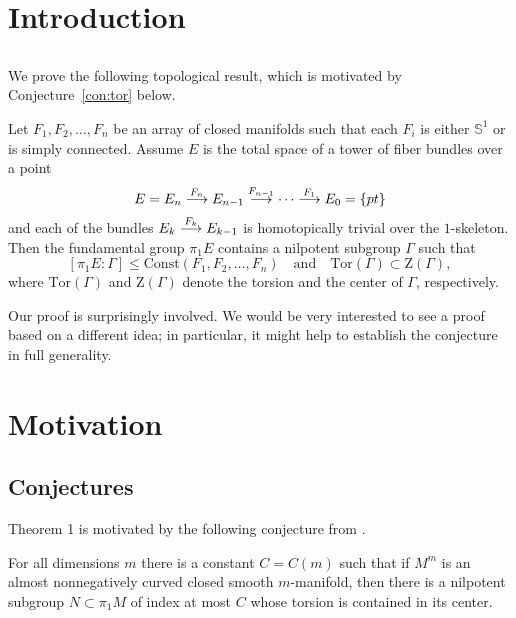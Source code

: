 \documentclass{amsart}
\begin{document}
\section*{Introduction}

\subsection{}
We prove the following topological result, which is motivated by Conjecture~\ref{con:tor} below.


\begin{thm}\label{thm:smooth}
Let $F_1,F_2,\dots,F_n$ be an array of closed manifolds 
such that each $F_i$ is either $\mathbb{S}^{1}$ or is simply connected. 
Assume $E$ is the total space of a tower of fiber bundles over a point
$$E=E_n\buildrel {F_n}\over \longrightarrow E_{n-1}\buildrel {F_{n-1}}\over\longrightarrow\dots\buildrel {F_1}\over\longrightarrow E_0=\{pt\}$$
and each of the bundles $E_k\buildrel {F_k}\over \longrightarrow E_{k-1}$ is homotopically trivial over the $1$-skeleton. 
Then the fundamental group $\pi_1E$ contains a nilpotent subgroup $\Gamma$ such that
$$[\pi_1E:\Gamma]\le \mathrm{Const}(F_1,F_2,\dots,F_n)\quad\text{and}\quad\mathrm{Tor}(\Gamma)\subset \mathrm{Z}(\Gamma),$$
where $\mathrm{Tor}(\Gamma)$ and $\mathrm{Z}(\Gamma)$ denote the torsion and the center of $\Gamma$, respectively.
\end{thm}

Our proof is surprisingly involved. 
We would be very interested to see a proof based on a different idea;
in particular, it might help to establish the conjecture in  full generality.

\section*{Motivation}

\subsection{Conjectures} Theorem 1 is motivated by the following conjecture from \cite{KPT}.

\begin{mconj}\label{con:tor}
For all dimensions $m$ there is a constant $C=C(m)$ such that if $M^m$ is an almost nonnegatively curved 
closed smooth $m$-manifold, then there is a nilpotent subgroup $N\subset \pi_1M$ of index  at most $C$ whose torsion is contained in its center.
\end{mconj}
\end{document}
